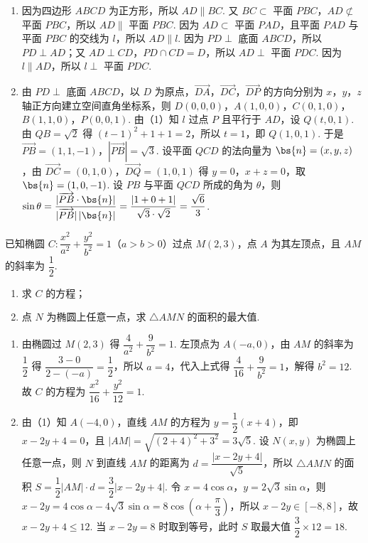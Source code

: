 \begin{solution}
\begin{enumerate}
\item 因为四边形 \(ABCD\) 为正方形，所以 \(AD\parallel BC\). 又 \(BC\subset\) 平面 \(PBC\)，\(AD\not\subset\) 平面 \(PBC\)，所以 \(AD\parallel\) 平面 \(PBC\). 因为 \(AD\subset\) 平面 \(PAD\)，且平面 \(PAD\) 与平面 \(PBC\) 的交线为 \(l\)，所以 \(AD\parallel l\). 因为 \(PD\perp\) 底面 \(ABCD\)，所以 \(PD\perp AD\)；又 \(AD\perp CD\)，\(PD\cap CD=D\)，所以 \(AD\perp\) 平面 \(PDC\). 因为 \(l\parallel AD\)，所以 \(l\perp\) 平面 \(PDC\).
\item 由 \(PD\perp\) 底面 \(ABCD\)，以 \(D\) 为原点，\(\overrightarrow{DA}\)，\(\overrightarrow{DC}\)，\(\overrightarrow{DP}\) 的方向分别为 \(x\)，\(y\)，\(z\) 轴正方向建立空间直角坐标系，则 \(D(0,0,0)\)，\(A(1,0,0)\)，\(C(0,1,0)\)，\(B(1,1,0)\)，\(P(0,0,1)\). 由（1）知 \(l\) 过点 \(P\) 且平行于 \(AD\)，设 \(Q(t,0,1)\). 由 \(QB=\sqrt2\) 得 \((t-1)^2+1+1=2\)，所以 \(t=1\)，即 \(Q(1,0,1)\). 于是 \(\overrightarrow{PB}=(1,1,-1)\)，\(|\overrightarrow{PB}|=\sqrt3\). 设平面 \(QCD\) 的法向量为 \(\bs{n}=(x,y,z)\)，由 \(\overrightarrow{DC}=(0,1,0)\)，\(\overrightarrow{DQ}=(1,0,1)\) 得 \(y=0\)，\(x+z=0\)，取 \(\bs{n}=(1,0,-1)\). 设 \(PB\) 与平面 \(QCD\) 所成的角为 \(\theta\)，则 \(\sin\theta=\dfrac{|\overrightarrow{PB}\cdot\bs{n}|}{|\overrightarrow{PB}|\,|\bs{n}|}=\dfrac{|1+0+1|}{\sqrt3\cdot\sqrt2}=\dfrac{\sqrt6}{3}\).
\end{enumerate}
\end{solution}

\begin{problem}
已知椭圆 \(C:\dfrac{x^2}{a^2}+\dfrac{y^2}{b^2}=1\)（\(a>b>0\)）过点 \(M(2,3)\)，点 \(A\) 为其左顶点，且 \(AM\) 的斜率为 \(\dfrac12\).

\begin{enumerate}
\item 求 \(C\) 的方程；
\item 点 \(N\) 为椭圆上任意一点，求 \(\triangle AMN\) 的面积的最大值.
\end{enumerate}
\end{problem}

\begin{solution}
\begin{enumerate}
\item 由椭圆过 \(M(2,3)\) 得 \(\dfrac4{a^2}+\dfrac9{b^2}=1\). 左顶点为 \(A(-a,0)\)，由 \(AM\) 的斜率为 \(\dfrac12\) 得 \(\dfrac{3-0}{2-(-a)}=\dfrac12\)，所以 \(a=4\)，代入上式得 \(\dfrac4{16}+\dfrac9{b^2}=1\)，解得 \(b^2=12\). 故 \(C\) 的方程为 \(\dfrac{x^2}{16}+\dfrac{y^2}{12}=1\).
\item 由（1）知 \(A(-4,0)\)，直线 \(AM\) 的方程为 \(y=\dfrac12(x+4)\)，即 \(x-2y+4=0\)，且 \(|AM|=\sqrt{(2+4)^2+3^2}=3\sqrt5\). 设 \(N(x,y)\) 为椭圆上任意一点，则 \(N\) 到直线 \(AM\) 的距离为 \(d=\dfrac{|x-2y+4|}{\sqrt5}\)，所以 \(\triangle AMN\) 的面积 \(S=\dfrac12|AM|\cdot d=\dfrac32|x-2y+4|\). 令 \(x=4\cos\alpha\)，\(y=2\sqrt3\sin\alpha\)，则 \(x-2y=4\cos\alpha-4\sqrt3\sin\alpha=8\cos\left(\alpha+\dfrac{\pi}{3}\right)\)，所以 \(x-2y\in[-8,8]\)，故 \(x-2y+4\le12\). 当 \(x-2y=8\) 时取到等号，此时 \(S\) 取最大值 \(\dfrac32\times12=18\).
\end{enumerate}
\end{solution}


